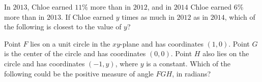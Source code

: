 \vspace{2em}
\newpage

\noindent\markforreview
\vspace{1em}

In \(2013\), Chloe earned \(11\%\) more than in \(2012\), and in \(2014\) Chloe earned \(6\%\) more than in \(2013\). If Chloe earned \(y\) times as much in \(2012\) as in \(2014\), which of the following is closest to the value of \(y\)?

\vspace{0.75em}


\vspace{2em}
\newpage

\noindent\markforreview
\vspace{1em}

Point \(F\) lies on a unit circle in the \(xy\)-plane and has coordinates \((1, 0)\). Point \(G\) is the center of the circle and has coordinates \((0, 0)\). Point \(H\) also lies on the circle and has coordinates \((-1, y)\), where \(y\) is a constant. Which of the following could be the positive measure of angle \(FGH\), in radians?

\vspace{0.75em}


